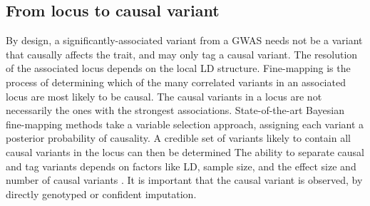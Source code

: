 \begin{outline}
%
%
%
%
%

\subsection{From locus to causal variant}

\1 By design, a significantly-associated variant from a \gls{GWAS} needs not be a variant that causally affects the trait, and may only tag a causal variant.
The resolution of the associated locus depends on the local \gls{LD} structure.
Fine-mapping is the process of determining which of the many correlated variants in an associated locus are most likely to be causal.
The causal variants in a locus are not necessarily the ones with the strongest associations.
State-of-the-art Bayesian fine-mapping methods take a variable selection approach, 
assigning each variant a posterior probability of causality.
A credible set of variants likely to contain all causal variants in the locus can then be determined
\autocite{schaid2018GenomewideAssociationsCandidate,wang2020SimpleNewApproach} 
The ability to separate causal and tag variants depends on factors like \gls{LD}, sample size, and the effect size and number of causal variants  \autocite{visscher201710YearsGWAS,schaid2018GenomewideAssociationsCandidate}.
It is important that the causal variant is observed, by directly genotyped or confident imputation.


\end{outline}
